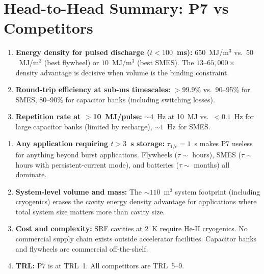 \documentclass[11pt]{article}
\begin{document}
\section{Head-to-Head Summary: P7 vs Competitors}
\label{sec:P7-head-to-head}

\begin{tcolorbox}[colback=blue!5!white, colframe=blue!60!black,
  title=\textbf{Where DFD P7 Wins}]
\begin{enumerate}[nosep]
\item \textbf{Energy density for pulsed discharge ($t < 100$~ms):}
  $650$~MJ/m$^3$ vs.\ $50$~MJ/m$^3$ (best flywheel) or $10$~MJ/m$^3$
  (best SMES). The $13$--$65{,}000\times$ density advantage is decisive
  when volume is the binding constraint.
\item \textbf{Round-trip efficiency at sub-ms timescales:}
  $>99.9\%$ vs.\ 90--95\% for SMES, 80--90\% for capacitor banks
  (including switching losses).
\item \textbf{Repetition rate at $>$10~MJ/pulse:}
  $\sim 4$~Hz at 10~MJ vs.\ $<0.1$~Hz for large capacitor banks
  (limited by recharge), $\sim 1$~Hz for SMES.
\end{enumerate}
\end{tcolorbox}

\begin{tcolorbox}[colback=red!5!white, colframe=red!60!black,
  title=\textbf{Where DFD P7 Loses}]
\begin{enumerate}[nosep]
\item \textbf{Any application requiring $t > 3$~s storage:}
  $\tau_{1/e} = 1$~s makes P7 useless for anything beyond burst
  applications. Flywheels ($\tau \sim$ hours), SMES ($\tau \sim$ hours
  with persistent-current mode), and batteries ($\tau \sim$ months)
  all dominate.
\item \textbf{System-level volume and mass:}
  The $\sim 110$~m$^3$ system footprint (including cryogenics) erases
  the cavity energy density advantage for applications where total
  system size matters more than cavity size.
\item \textbf{Cost and complexity:}
  SRF cavities at 2~K require He-II cryogenics. No commercial
  supply chain exists outside accelerator facilities. Capacitor banks
  and flywheels are commercial off-the-shelf.
\item \textbf{TRL:}
  P7 is at TRL~1. All competitors are TRL~5--9.
\end{enumerate}
\end{tcolorbox}
\end{document}
